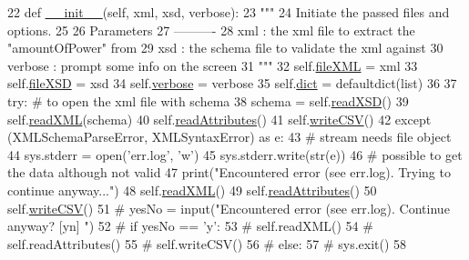 \begin{DoxyCode}
22     \textcolor{keyword}{def }\hyperlink{classex2_1_1ParseXML_a34388961dd25cf9813e954854a06bf89}{\_\_init\_\_}(self, xml, xsd, verbose):
23         \textcolor{stringliteral}{"""}
24 \textcolor{stringliteral}{        Initiate the passed files and options.}
25 \textcolor{stringliteral}{}
26 \textcolor{stringliteral}{        Parameters}
27 \textcolor{stringliteral}{        ----------}
28 \textcolor{stringliteral}{        xml : the xml file to extract the "amountOfPower" from}
29 \textcolor{stringliteral}{        xsd : the schema file to validate the xml against}
30 \textcolor{stringliteral}{        verbose : prompt some info on the screen}
31 \textcolor{stringliteral}{        """}
32         self.\hyperlink{classex2_1_1ParseXML_ae06baa8c594f88a71490e8bafae1da37}{fileXML} = xml
33         self.\hyperlink{classex2_1_1ParseXML_a6075f0d21a2b394e7d6413347967b61e}{fileXSD} = xsd
34         self.\hyperlink{classex2_1_1ParseXML_a903303a97ffb911574f691744978e7e5}{verbose} = verbose
35         self.\hyperlink{classex2_1_1ParseXML_a782928ec4f5e8e20237621fb7a9178b7}{dict} = defaultdict(list)
36 
37         \textcolor{keywordflow}{try}:  \textcolor{comment}{# to open the xml file with schema}
38             schema = self.\hyperlink{classex2_1_1ParseXML_a4895e49c1059c9aedd93f97c29eee30f}{readXSD}()
39             self.\hyperlink{classex2_1_1ParseXML_a5525ea8efb94c0fd12c9100b04702c5b}{readXML}(schema)
40             self.\hyperlink{classex2_1_1ParseXML_ad085ab1449b4ae5d51fef904d759c73b}{readAttributes}()
41             self.\hyperlink{classex2_1_1ParseXML_a87b2265b8dccd79ff09bd10ee2f8c269}{writeCSV}()
42         \textcolor{keywordflow}{except} (XMLSchemaParseError, XMLSyntaxError) \textcolor{keyword}{as} e:
43             \textcolor{comment}{# stream needs file object}
44             sys.stderr = open(\textcolor{stringliteral}{'err.log'}, \textcolor{stringliteral}{'w'})
45             sys.stderr.write(str(e))
46             \textcolor{comment}{# possible to get the data although not valid}
47             print(\textcolor{stringliteral}{"Encountered error (see err.log). Trying to continue anyway..."})
48             self.\hyperlink{classex2_1_1ParseXML_a5525ea8efb94c0fd12c9100b04702c5b}{readXML}()
49             self.\hyperlink{classex2_1_1ParseXML_ad085ab1449b4ae5d51fef904d759c73b}{readAttributes}()
50             self.\hyperlink{classex2_1_1ParseXML_a87b2265b8dccd79ff09bd10ee2f8c269}{writeCSV}()
51             \textcolor{comment}{# yesNo = input("Encountered error (see err.log). Continue anyway? [yn] ")}
52             \textcolor{comment}{# if yesNo == 'y':}
53             \textcolor{comment}{#     self.readXML()}
54             \textcolor{comment}{#     self.readAttributes()}
55             \textcolor{comment}{#     self.writeCSV()}
56             \textcolor{comment}{# else:}
57             \textcolor{comment}{#     sys.exit()}
58 
\end{DoxyCode}


